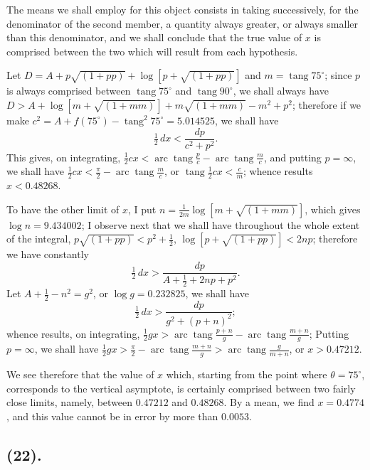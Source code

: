\documentclass{article}
\begin{document}

The means we shall employ for this object consists in taking successively, for the denominator of the second member, a quantity always greater, or always smaller than this denominator, and we shall conclude that the true value of $x$ is comprised between the two which will result from each hypothesis.

Let $D=A+p\sqrt{(1+pp)}+\log[p+\sqrt{(1+pp)}]$ and $m=\operatorname{tang}75^{\circ}$; since $p$ is always comprised between $\operatorname{tang}75^{\circ}$ and $\operatorname{tang}90^{\circ}$, we shall always have $D>A+\log[m+\sqrt{(1+mm)}]+m\sqrt{(1+mm)}-m^{2}+p^{2}$; therefore if we make $c^{2}=A+f(75^{\circ})-\operatorname{tang}^{2}75^{\circ}=5.014525$, we shall have
\[ \tfrac{1}{2}\,dx<\frac{dp}{c^{2}+p^{2}}. \]
This gives, on integrating, $\frac{1}{2}cx<\operatorname{arc}\operatorname{tang}\frac{p}{c}-\operatorname{arc}\operatorname{tang}\frac{m}{c}$, and putting $p=\infty$, we shall have $\frac{1}{2}cx<\frac{\pi}{2}-\operatorname{arc}\operatorname{tang}\frac{m}{c}$, or $\operatorname{tang}\frac{1}{2}cx<\frac{c}{m}$; whence results $x<0.48268$.

To have the other limit of $x$, I put $n=\frac{1}{2m}\log[m+\sqrt{(1+mm)}]$, which gives $\log n=9.434002$; I observe next that we shall have throughout the whole extent of the integral, $p\sqrt{(1+pp)}<p^{2}+\frac{1}{2}$, $\log[p+\sqrt{(1+pp)}]<2np$; therefore we have constantly
\[ \tfrac{1}{2}\,dx>\frac{dp}{A+\frac{1}{2}+2np+p^{2}}. \]
Let $A+\frac{1}{2}-n^{2}=g^{2}$, or $\log g=0.232825$, we shall have
\[ \tfrac{1}{2}\,dx>\frac{dp}{g^{2}+(p+n)^{2}}; \]
whence results, on integrating, $\frac{1}{2}gx>\operatorname{arc}\operatorname{tang}\frac{p+n}{g}-\operatorname{arc}\operatorname{tang}\frac{m+n}{g}$; Putting $p=\infty$, we shall have $\frac{1}{2}gx>\frac{\pi}{2}-\operatorname{arc}\operatorname{tang}\frac{m+n}{g}>\operatorname{arc}\operatorname{tang}\frac{g}{m+n}$, or $x>0.47212$.

We see therefore that the value of $x$ which, starting from the point where $\theta=75^{\circ}$, corresponds to the vertical asymptote, is certainly comprised between two fairly close limits, namely, between $0.47212$ and $0.48268$. By a mean, we find $x=0.4774$, and this value cannot be in error by more than $0.0053$.

\subsection*{(22).}
\end{document}
